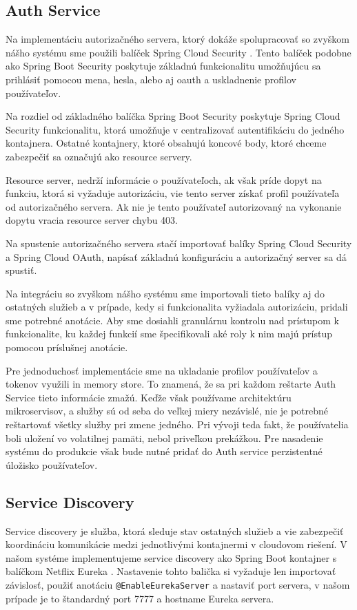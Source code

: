 \subsection{Auth Service}  \label{section_auth}

Na implementáciu autorizačného servera, ktorý dokáže spolupracovať so zvyškom nášho systému sme použili balíček Spring Cloud Security \cite{cloud_security}. Tento balíček podobne ako Spring Boot Security poskytuje základnú funkcionalitu umožňujúcu sa prihlásiť pomocou mena, hesla, alebo aj \acrshort{oauth} a uskladnenie profilov používateľov.

Na rozdiel od základného balíčka Spring Boot Security poskytuje Spring Cloud Security funkcionalitu, ktorá umožňuje v centralizovať autentifikáciu do jedného kontajnera. Ostatné kontajnery, ktoré obsahujú koncové body, ktoré chceme zabezpečiť sa označujú ako resource servery.

Resource server, nedrží informácie o používateľoch, ak však príde dopyt na funkciu, ktorá si vyžaduje autorizáciu, vie tento server získať profil používateľa od autorizačného servera. Ak nie je tento používateľ autorizovaný na vykonanie dopytu vracia resource server chybu 403.

Na spustenie autorizačného servera stačí importovať balíky  Spring Cloud Security a Spring Cloud OAuth, napísať základnú konfiguráciu a autorizačný server sa dá spustiť.

Na integráciu so zvyškom nášho systému sme importovali tieto balíky aj do ostatných služieb a v prípade, kedy si funkcionalita vyžiadala autorizáciu, pridali sme potrebné anotácie. Aby sme dosiahli granulárnu kontrolu nad prístupom k funkcionalite, ku každej funkcií sme špecifikovali aké roly k nim majú prístup pomocou príslušnej anotácie.

Pre jednoduchosť implementácie sme na ukladanie profilov používateľov a tokenov využili in memory store. To znamená, že sa pri každom reštarte Auth Service tieto informácie zmažú. Keďže však používame architektúru mikroservisov, a služby sú od seba do veľkej miery nezávislé, nie je potrebné reštartovať všetky služby pri zmene jedného. Pri vývoji teda fakt, že používatelia boli uložení vo volatilnej pamäti, nebol priveľkou prekážkou. Pre nasadenie systému do produkcie však bude nutné pridať do Auth service perzistentné úložisko používateľov.


\subsection{Service Discovery}
Service discovery je služba, ktorá sleduje stav ostatných služieb a vie zabezpečiť koordináciu komunikácie medzi jednotlivými kontajnermi v cloudovom riešení. V našom systéme implementujeme service discovery ako Spring Boot kontajner s balíčkom Netflix Eureka \cite{eureka}. Nastavenie tohto balička si vyžaduje len importovať závislosť, použiť anotáciu \texttt{@EnableEurekaServer} a nastaviť port servera, v našom prípade je to štandardný port 7777 a hostname Eureka servera.


